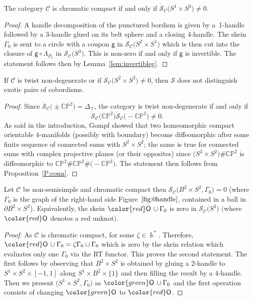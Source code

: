 \documentclass[pdftex]{sigma}
\numberwithin{equation}{section}
\newcommand{\gm}{{\mathsf{g}}}
\numberwithin{theorem}{section}
\numberwithin{proposition}{section}
\numberwithin{definition}{section}
\numberwithin{lemma}{section}
\numberwithin{corollary}{section}
\numberwithin{remark}{section}
\numberwithin{example}{section}
\newcommand{\cat}{\mathcal{C}}
\newcommand{\unit}{\ensuremath{\mathds{1}}}
\newcommand{\FK}{{\Bbbk}}
\newcommand{\CP}{\mathbb{CP}}
\newcommand{\TSkein}{{\mathscr{S}}}
\newcounter{exo} \newcounter{numexercice}
\begin{document}
\begin{proposition}
The category $\cat$ is chromatic compact if and only if $\dot\TSkein_\cat\bigl({S^1\times S^3}\bigr)\neq 0$.
\end{proposition}
\begin{proof}
 A handle decomposition of the punctured bordism
  is given by a~1-handle followed by a
 3-handle glued on its belt sphere and a closing 4-handle. The skein $\Gamma_0$ is sent to a circle with a coupon
 $\gm$ in $\TSkein_\cat\bigl(S^2\times S^1\bigr)$ which is then cut into the
 closure of $\gm \circ \Lambda_{P_\unit}$ in
 $\TSkein_\cat\bigl(S^3\bigr)$. This is non-zero if and only if $\gm$ is
 invertible. The statement follows then by Lemma~\ref{lem:invertibleg}.
\end{proof}
\begin{proposition}
 If $\cat$ is twist non-degenerate or if
 $\dot\TSkein_\cat\bigl(S^2\times S^2\bigr)\neq0$, then $\TSkein$ does not distinguish
 exotic pairs of cobordisms.
\end{proposition}
\begin{proof}
 Since $\dot\TSkein_\cat\bigl(\pm\CP^2\bigr)=\Delta_{\mp}$, the category is twist non-degenerate if and only if
 \[
 \dot\TSkein_\cat\bigl(\CP^2\bigr)\dot\TSkein_\cat\bigl(-\CP^2\bigr)\neq0.
 \]
 As
 said in the introduction, Gompf \cite{Go} showed that two
 homeomorphic compact orientable $4$-manifolds (possibly with
 boundary) become diffeomorphic after some finite sequence of
 connected sums with $S^2\times S^2$; the same is true for connected sums with complex projective planes (or their opposites) since $\bigl(S^2 \times S^2\bigr)\#\CP^2$ is diffeomorphic to $\CP^2\#\CP^2\#\bigl(-{\CP}^2\bigr)$.
The statement then follows from Proposition~\ref{P:conn}.
\end{proof}
\begin{proposition}
 Let $\cat$ be non-semisimple and chromatic compact then ${\TSkein_\cat\bigl(B^2\times S^2,\Gamma_0\bigr)=0}$ \big(where $\Gamma_0$ is the graph of the right-hand side Figure~$\ref{fig:0handle}$, contained in a ball in $\partial B^2\times S^2$\big).
Equivalently,
the
 skein ${\color{red}\mathsf O}\,\cup\Gamma_0$ is zero in
 $\TSkein_\cat\bigl(S^3\bigr)$ $($where ${\color{red}\mathsf O}$ denotes a red unknot$)$.
\end{proposition}
\begin{proof}
As $\cat$ is chromatic compact,
\smash{$\Delta_0^{P_\unit}=\zeta\Lambda_{P_{\unit}}$} for some $\zeta\in \FK^*$. Therefore, ${\color{red}\mathsf O}\,\cup\Gamma_0=\zeta \Gamma_0\sqcup \Gamma_0$ which is zero by the skein relation which evaluates only one $\Gamma_0$ via the RT functor. This proves the second statement. The first follows by observing that $B^2\times S^2$ is obtained by gluing a $2$-handle to $S^1\times S^2\times [-1,1]$ along $S^1\times B^2\times \{1\}$ and then filling the result by a $4$-handle. Then we present $\bigl(S^1\times S^2,\Gamma_0\bigr)$ as ${\color{green}\mathsf O}\,\cup\Gamma_0$ and the first operation consists of changing ${\color{green}\mathsf O}$ to ${\color{red}\mathsf O}$.
\end{proof}
\end{document}
